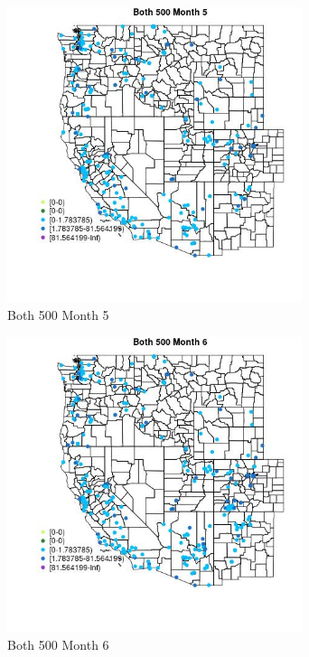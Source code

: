 \begin{figure} 
\centering  
\includegraphics[width=0.77\textwidth]{Code_Outputs/Report_ML_input_PM25_Step4_part_e_de_duplicated_aveswNAs_MapObsMo5Both_500.jpg} 
\caption{\label{fig:Report_ML_input_PM25_Step4_part_e_de_duplicated_aveswNAsMapObsMo5Both_500}Both 500 Month 5} 
\end{figure} 
 

\begin{figure} 
\centering  
\includegraphics[width=0.77\textwidth]{Code_Outputs/Report_ML_input_PM25_Step4_part_e_de_duplicated_aveswNAs_MapObsMo6Both_500.jpg} 
\caption{\label{fig:Report_ML_input_PM25_Step4_part_e_de_duplicated_aveswNAsMapObsMo6Both_500}Both 500 Month 6} 
\end{figure} 
 

